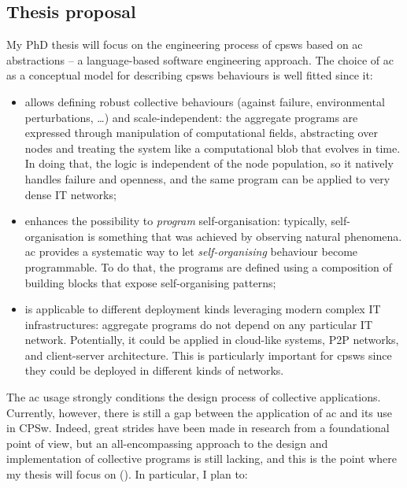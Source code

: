 \documentclass[11pt]{article}
\begin{document}
\subsection{Thesis proposal}
My PhD thesis will focus on the engineering process of \acp{cpsw} based on \ac{ac} abstractions -- a language-based software engineering approach. 
%
The choice of \ac{ac} as a conceptual model for describing \acp{cpsw} behaviours is well fitted since it:
\begin{itemize}
	\item allows defining robust collective behaviours (against failure, environmental perturbations, \dots{}) and scale-independent: 
	the aggregate programs are expressed through manipulation of computational fields, abstracting over nodes and treating the system like a computational blob that evolves in time. 
	In doing that, the logic is independent of the node population, so it natively handles failure and openness, and the same program can be applied to very dense IT networks;
	\item enhances the possibility to \textit{program} self-organisation: typically, self-organisation is something that was achieved by observing natural phenomena. 
	\ac{ac} provides a systematic way to let \textit{self-organising} behaviour become programmable.
	To do that, the programs are defined using a composition of building blocks that expose self-organising patterns;
	\item is applicable to different deployment kinds leveraging modern complex IT infrastructures: aggregate programs do not depend on any particular IT network. 
	Potentially, it could be applied in cloud-like systems, P2P networks, and client-server architecture. 
	This is particularly important for \acp{cpsw} since they could be deployed in different kinds of networks.
\end{itemize}
The \ac{ac} usage strongly conditions the design process of collective applications.
%
Currently, however, there is still a gap between the application of \ac{ac} and its use in CPSw. 
%
Indeed, great strides have been made in research from a foundational point of view, but an all-encompassing approach to the design and implementation of collective programs is still lacking, and this is the point where my thesis will focus on ().
%
In particular, I plan to:
\end{document}
